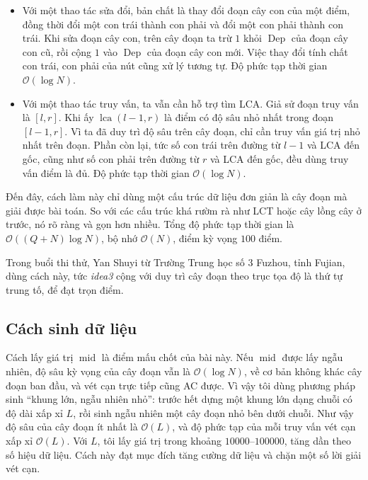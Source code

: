 \documentclass[11pt]{article}
\newcommand{\Oh}{\mathcal{O}}
\begin{document}
\begin{itemize}
  \item Với một thao tác sửa đổi, bản chất là thay đổi đoạn cây con của một
  điểm, đồng thời đổi một con trái thành con phải và đổi một con phải thành con
  trái. Khi sửa đoạn cây con, trên cây đoạn ta trừ \(1\) khỏi
  \(\operatorname{Dep}\) của đoạn cây con cũ, rồi cộng \(1\) vào
  \(\operatorname{Dep}\) của đoạn cây con mới. Việc thay đổi tính chất con trái,
  con phải của nút cũng xử lý tương tự. Độ phức tạp thời gian \(\Oh(\log N)\).

  \item Với một thao tác truy vấn, ta vẫn cần hỗ trợ tìm LCA. Giả sử đoạn truy
  vấn là \([l,r]\). Khi ấy \(\operatorname{lca}(l-1,r)\) là điểm có độ sâu nhỏ
  nhất trong đoạn \([l-1,r]\). Vì ta đã duy trì độ sâu trên cây đoạn, chỉ cần
  truy vấn giá trị nhỏ nhất trên đoạn. Phần còn lại, tức số con trái trên đường
  từ \(l-1\) và LCA đến gốc, cũng như số con phải trên đường từ \(r\) và LCA
  đến gốc, đều dùng truy vấn điểm là đủ. Độ phức tạp thời gian \(\Oh(\log N)\).
\end{itemize}

Đến đây, cách làm này chỉ dùng một cấu trúc dữ liệu đơn giản là cây đoạn mà
giải được bài toán. So với các cấu trúc khá rườm rà như LCT hoặc cây lồng cây
ở trước, nó rõ ràng và gọn hơn nhiều. Tổng độ phức tạp thời gian là
\(\Oh((Q+N)\log N)\), bộ nhớ \(\Oh(N)\), điểm kỳ vọng \(100\) điểm.

Trong buổi thi thử, Yan Shuyi từ Trường Trung học số 3 Fuzhou, tỉnh Fujian,
dùng cách này, tức \emph{idea3} cộng với duy trì cây đoạn theo trục tọa độ là
thứ tự trung tố, để đạt trọn điểm.

\subsection{Cách sinh dữ liệu}

Cách lấy giá trị \(\operatorname{mid}\) là điểm mấu chốt của bài này. Nếu
\(\operatorname{mid}\) được lấy ngẫu nhiên, độ sâu kỳ vọng của cây đoạn vẫn là
\(\Oh(\log N)\), về cơ bản không khác cây đoạn ban đầu, và vét cạn trực tiếp
cũng AC được. Vì vậy tôi dùng phương pháp sinh ``khung lớn, ngẫu nhiên nhỏ'':
trước hết dựng một khung lớn dạng chuỗi có độ dài xấp xỉ \(L\), rồi sinh ngẫu
nhiên một cây đoạn nhỏ bên dưới chuỗi. Như vậy độ sâu của cây đoạn ít nhất là
\(\Oh(L)\), và độ phức tạp của mỗi truy vấn vét cạn xấp xỉ \(\Oh(L)\). Với
\(L\), tôi lấy giá trị trong khoảng \(10000\)--\(100000\), tăng dần theo số
hiệu dữ liệu. Cách này đạt mục đích tăng cường dữ liệu và chặn một số lời giải
vét cạn.
\end{document}
